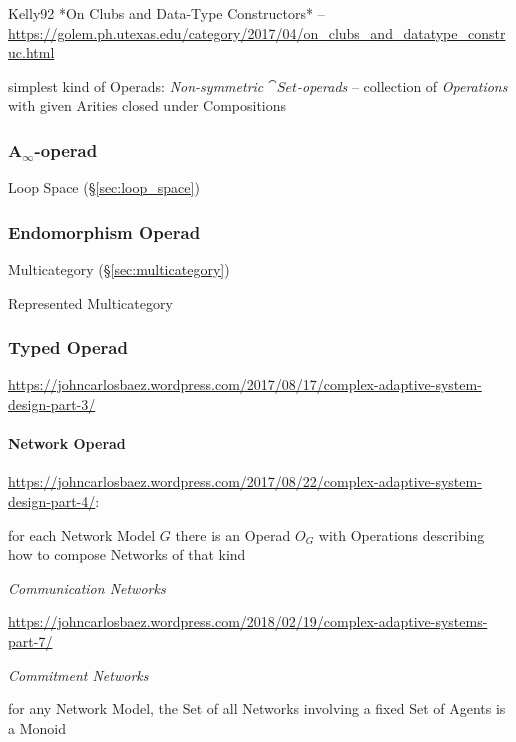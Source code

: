 Kelly92 *On Clubs and Data-Type Constructors* --
\url{https://golem.ph.utexas.edu/category/2017/04/on_clubs_and_datatype_construc.html}

simplest kind of Operads: \emph{Non-symmetric $\cat{Set}$-operads} --
collection of \emph{Operations} with given Arities closed under
Compositions



\subsubsection{A$_\infty$-operad}\label{sec:a_infinity_operad}

Loop Space (\S\ref{sec:loop_space})



\subsubsection{Endomorphism Operad}\label{sec:endomorphism_operad}

Multicategory (\S\ref{sec:multicategory})

Represented Multicategory



\subsubsection{Typed Operad}\label{sec:typed_operad}

\url{https://johncarlosbaez.wordpress.com/2017/08/17/complex-adaptive-system-design-part-3/}



\paragraph{Network Operad}\label{sec:network_operad}\hfill

\url{https://johncarlosbaez.wordpress.com/2017/08/22/complex-adaptive-system-design-part-4/}:

for each Network Model $G$ there is an Operad $O_G$ with Operations describing
how to compose Networks of that kind

\emph{Communication Networks}

\url{https://johncarlosbaez.wordpress.com/2018/02/19/complex-adaptive-systems-part-7/}

\emph{Commitment Networks}

for any Network Model, the Set of all Networks involving a fixed Set of Agents
is a Monoid

